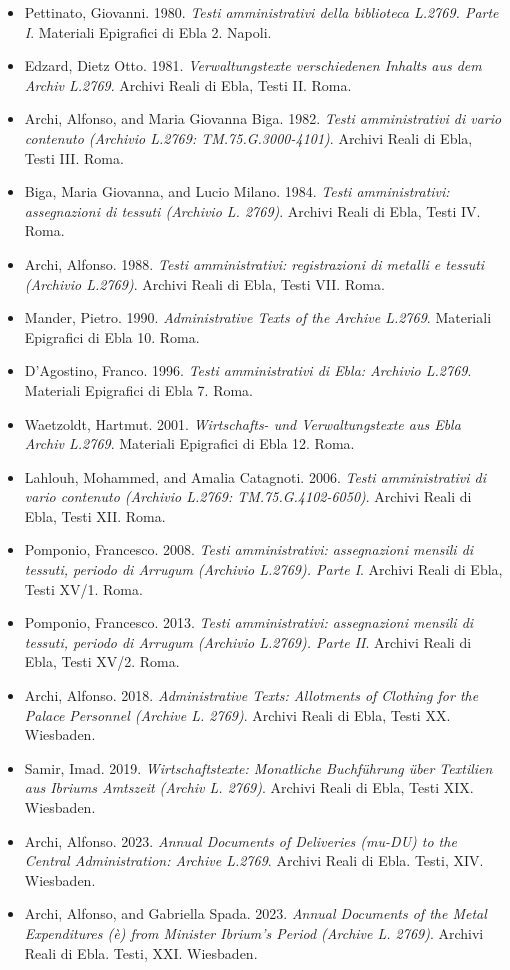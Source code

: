 \documentclass[
]{book}
\providecommand{\tightlist}{%
  \setlength{\itemsep}{0pt}\setlength{\parskip}{0pt}}
\begin{document}
\begin{itemize}
\tightlist
\item
  Pettinato, Giovanni. 1980. \emph{Testi amministrativi della biblioteca L.2769. Parte I}. Materiali Epigrafici di Ebla 2. Napoli.
\item
  Edzard, Dietz Otto. 1981. \emph{Verwaltungstexte verschiedenen Inhalts aus dem Archiv L.2769}. Archivi Reali di Ebla, Testi II. Roma.
\item
  Archi, Alfonso, and Maria Giovanna Biga. 1982. \emph{Testi amministrativi di vario contenuto (Archivio L.2769: TM.75.G.3000-4101)}. Archivi Reali di Ebla, Testi III. Roma.
\item
  Biga, Maria Giovanna, and Lucio Milano. 1984. \emph{Testi amministrativi: assegnazioni di tessuti (Archivio L. 2769)}. Archivi Reali di Ebla, Testi IV. Roma.
\item
  Archi, Alfonso. 1988. \emph{Testi amministrativi: registrazioni di metalli e tessuti (Archivio L.2769)}. Archivi Reali di Ebla, Testi VII. Roma.
\item
  Mander, Pietro. 1990. \emph{Administrative Texts of the Archive L.2769}. Materiali Epigrafici di Ebla 10. Roma.
\item
  D'Agostino, Franco. 1996. \emph{Testi amministrativi di Ebla: Archivio L.2769}. Materiali Epigrafici di Ebla 7. Roma.
\item
  Waetzoldt, Hartmut. 2001. \emph{Wirtschafts- und Verwaltungstexte aus Ebla Archiv L.2769}. Materiali Epigrafici di Ebla 12. Roma.
\item
  Lahlouh, Mohammed, and Amalia Catagnoti. 2006. \emph{Testi amministrativi di vario contenuto (Archivio L.2769: TM.75.G.4102-6050)}. Archivi Reali di Ebla, Testi XII. Roma.
\item
  Pomponio, Francesco. 2008. \emph{Testi amministrativi: assegnazioni mensili di tessuti, periodo di Arrugum (Archivio L.2769). Parte I}. Archivi Reali di Ebla, Testi XV/1. Roma.
\item
  Pomponio, Francesco. 2013. \emph{Testi amministrativi: assegnazioni mensili di tessuti, periodo di Arrugum (Archivio L.2769). Parte II}. Archivi Reali di Ebla, Testi XV/2. Roma.
\item
  Archi, Alfonso. 2018. \emph{Administrative Texts: Allotments of Clothing for the Palace Personnel (Archive L. 2769)}. Archivi Reali di Ebla, Testi XX. Wiesbaden.
\item
  Samir, Imad. 2019. \emph{Wirtschaftstexte: Monatliche Buchführung über Textilien aus Ibriums Amtszeit (Archiv L. 2769)}. Archivi Reali di Ebla, Testi XIX. Wiesbaden.
\item
  Archi, Alfonso. 2023. \emph{Annual Documents of Deliveries (mu-DU) to the Central Administration: Archive L.2769}. Archivi Reali di Ebla. Testi, XIV. Wiesbaden.
\item
  Archi, Alfonso, and Gabriella Spada. 2023. \emph{Annual Documents of the Metal Expenditures (è) from Minister Ibrium's Period (Archive L. 2769)}. Archivi Reali di Ebla. Testi, XXI. Wiesbaden.
\end{itemize}
\end{document}
